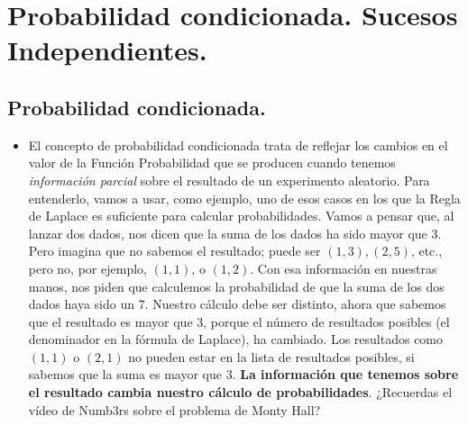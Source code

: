 \section{Probabilidad condicionada. Sucesos Independientes.}


\subsection{Probabilidad condicionada.}

\begin{itemize}

    \item El concepto de probabilidad condicionada trata de reflejar los cambios en el valor de la Función Probabilidad que se producen cuando tenemos {\em información parcial} sobre el resultado de un experimento aleatorio. Para entenderlo, vamos a usar, como ejemplo, uno de esos casos en los que la Regla de Laplace es suficiente para calcular probabilidades. Vamos a pensar que, al lanzar dos dados, nos dicen que la suma de los dados ha sido mayor que 3. Pero imagina que no sabemos el resultado; puede ser $(1,3), (2,5)$, etc., pero no, por ejemplo, $(1,1)$, o $(1,2)$. Con esa información en nuestras manos, nos piden que calculemos la probabilidad de que la suma de los dos dados haya sido un $7$. Nuestro cálculo debe ser distinto, ahora que sabemos que el resultado es mayor que 3, porque el número de resultados posibles (el denominador en la fórmula de Laplace), ha cambiado. Los resultados como $(1,1)$ o $(2,1)$ no pueden estar en la lista de resultados posibles, {\sf si sabemos que la suma es mayor que $3$}.
 {\bf La información que tenemos sobre el resultado cambia nuestro cálculo de probabilidades}. ¿Recuerdas el vídeo de Numb3rs sobre el problema de Monty Hall?


\end{itemize}
